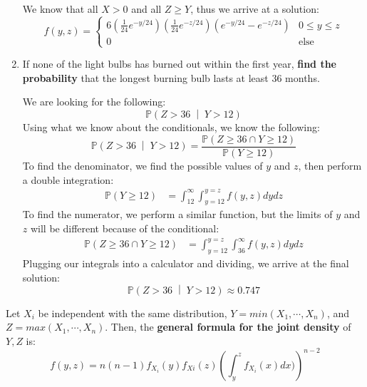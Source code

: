 \documentclass[titlepage, 12pt, leqno]{article}
\begin{document}
\begin{ex}
\begin{enumerate}
            We know that all $X>0$ and all $Z \ge Y$, thus we arrive at a 
            solution:
            \[
            \boxed{
                f(y,z) = 
                \begin{cases}
                    6\left(\frac{1}{24}e^{-y/24}\right)
                \left(\frac{1}{24}e^{-z/24}\right)\left(e^{-y/24}-
                e^{-z/24}\right)& 0 \le y \le z \\
                    0 & \text{else}
                \end{cases}
            } 
            \]
        \item If none of the light bulbs has burned out within the first year, 
            \textbf{find the probability} that the longest burning bulb lasts at
            least 36 months.
            \vspace{10px}
            
            We are looking for the following:
            \[
                \mathbb{P}\left(Z>36 \;\middle|\; Y>12\right) 
            \]
            Using what we know about the conditionals, we know the following:
            \[
                \mathbb{P}\left(Z>36 \;\middle|\; Y>12\right) 
                = \frac{\mathbb{P}(Z \ge 36 \cap Y \ge 12)}{\mathbb{P}(Y \ge 12)}
            \]
            To find the denominator, we find the possible values of $y$ and $z$, 
            then perform a double integration:
            \begin{align*}
                \mathbb{P}(Y \ge 12) &= 
                \int_{12}^{\infty} \int_{y=12}^{y=z}f(y,z)dydz
            \end{align*}
            To find the numerator, we perform a similar function, but the limits
            of $y$ and $z$ will be different because of the conditional:
            \begin{align*}
                \mathbb{P}(Z \ge 36 \cap Y \ge 12) &=
                \int_{y=12}^{y=z}\int_{36}^{\infty}f(y,z)dydz
            \end{align*}
            Plugging our integrals into a calculator and dividing, we arrive at
            the final solution:
            \[
            \boxed{
                \mathbb{P}\left(Z > 36 \;\middle|\; Y > 12\right) \approx 0.747
            } 
            \]
    \end{enumerate}
\end{ex}

Let $X_i$ be independent with the same distribution, $Y = min(X_1, \cdots ,X_n)$,
and $Z = max(X_1, \cdots , X_n)$. Then, the \textbf{general formula for the
joint density} of $Y,Z$ is:
\[
    \boxed{
    f(y,z) = n(n-1)f_{X_i}(y)f_{Xi}(z)\left(\int_{y}^{z}f_{X_i}(x)dx)\right)^{n-2}
    }
\]
\pagebreak
\end{document}

